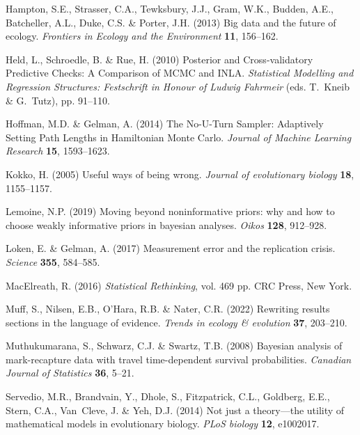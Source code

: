 \documentclass[11pt]{article}
\begin{document}
\begin{thebibliography}{35}
Hampton, S.E., Strasser, C.A., Tewksbury, J.J., Gram, W.K., Budden, A.E.,
  Batcheller, A.L., Duke, C.S. \& Porter, J.H. (2013) Big data and the future
  of ecology. \emph{Frontiers in Ecology and the Environment} \textbf{11},
  156--162.

Held, L., Schroedle, B. \& Rue, H. (2010) {Posterior and Cross-validatory
  Predictive Checks: A Comparison of MCMC and INLA}. \emph{Statistical
  Modelling and Regression Structures: Festschrift in Honour of Ludwig
  Fahrmeir} (eds. T.~Kneib \& G.~Tutz), pp. 91--110.

Hoffman, M.D. \& Gelman, A. (2014) {The No-U-Turn Sampler: Adaptively Setting
  Path Lengths in Hamiltonian Monte Carlo}. \emph{Journal of Machine Learning
  Research} \textbf{15}, 1593--1623.

Kokko, H. (2005) Useful ways of being wrong. \emph{Journal of evolutionary
  biology} \textbf{18}, 1155--1157.

Lemoine, N.P. (2019) Moving beyond noninformative priors: why and how to choose
  weakly informative priors in bayesian analyses. \emph{Oikos} \textbf{128},
  912--928.

Loken, E. \& Gelman, A. (2017) Measurement error and the replication crisis.
  \emph{Science} \textbf{355}, 584--585.

MacElreath, R. (2016) \emph{Statistical Rethinking}, vol. 469 pp. CRC Press,
  New York.

Muff, S., Nilsen, E.B., O'Hara, R.B. \& Nater, C.R. (2022) Rewriting results
  sections in the language of evidence. \emph{Trends in ecology \& evolution}
  \textbf{37}, 203--210.

Muthukumarana, S., Schwarz, C.J. \& Swartz, T.B. (2008) Bayesian analysis of
  mark-recapture data with travel time-dependent survival probabilities.
  \emph{Canadian Journal of Statistics} \textbf{36}, 5--21.

Servedio, M.R., Brandvain, Y., Dhole, S., Fitzpatrick, C.L., Goldberg, E.E.,
  Stern, C.A., Van~Cleve, J. \& Yeh, D.J. (2014) Not just a theory---the
  utility of mathematical models in evolutionary biology. \emph{PLoS biology}
  \textbf{12}, e1002017.


\end{thebibliography}
\end{document}
